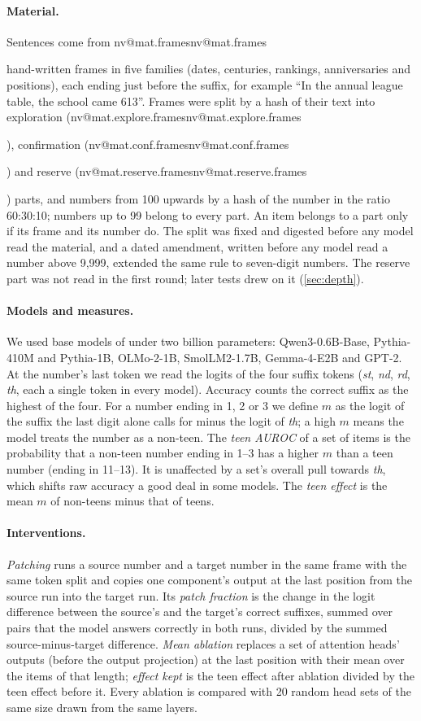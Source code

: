 \documentclass[11pt]{article}
\makeatletter
\newcommand{\nv}[1]{\ifcsname nv@#1\endcsname\csname nv@#1\endcsname\else\PackageError{numbers}{Unknown number key #1}{}\fi}
\newcommand{\qw}{Qwen3-0.6B-Base}
\newcommand{\ol}{OLMo-2-1B}
\newcommand{\sfx}[1]{\textit{#1}}
\makeatother
\begin{document}
\paragraph{Material.} Sentences come from \nv{mat.frames} hand-written frames in five families (dates, centuries, rankings, anniversaries and positions), each ending just before the suffix, for example ``In the annual league table, the school came 613''. Frames were split by a hash of their text into exploration (\nv{mat.explore.frames}), confirmation (\nv{mat.conf.frames}) and reserve (\nv{mat.reserve.frames}) parts, and numbers from 100 upwards by a hash of the number in the ratio 60:30:10; numbers up to 99 belong to every part. An item belongs to a part only if its frame and its number do. The split was fixed and digested before any model read the material, and a dated amendment, written before any model read a number above 9{,}999, extended the same rule to seven-digit numbers. The reserve part was not read in the first round; later tests drew on it (\cref{sec:depth}).

\paragraph{Models and measures.} We used base models of under two billion parameters: \qw{}, Pythia-410M and Pythia-1B, \ol{}, SmolLM2-1.7B, Gemma-4-E2B and GPT-2. At the number's last token we read the logits of the four suffix tokens (\sfx{st}, \sfx{nd}, \sfx{rd}, \sfx{th}, each a single token in every model). Accuracy counts the correct suffix as the highest of the four. For a number ending in 1, 2 or 3 we define $m$ as the logit of the suffix the last digit alone calls for minus the logit of \sfx{th}; a high $m$ means the model treats the number as a non-teen. The \emph{teen AUROC} of a set of items is the probability that a non-teen number ending in 1--3 has a higher $m$ than a teen number (ending in 11--13). It is unaffected by a set's overall pull towards \sfx{th}, which shifts raw accuracy a good deal in some models. The \emph{teen effect} is the mean $m$ of non-teens minus that of teens.

\paragraph{Interventions.} \emph{Patching} runs a source number and a target number in the same frame with the same token split and copies one component's output at the last position from the source run into the target run. Its \emph{patch fraction} is the change in the logit difference between the source's and the target's correct suffixes, summed over pairs that the model answers correctly in both runs, divided by the summed source-minus-target difference. \emph{Mean ablation} replaces a set of attention heads' outputs (before the output projection) at the last position with their mean over the items of that length; \emph{effect kept} is the teen effect after ablation divided by the teen effect before it. Every ablation is compared with 20 random head sets of the same size drawn from the same layers.
\end{document}
